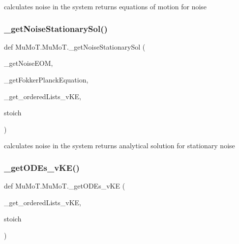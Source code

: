 calculates noise in the system returns equations of motion for noise 

\mbox{\label{namespace_mu_mo_t_1_1_mu_mo_t_a7bc4299a5e34403a5053afd4b043a0c3}} 
\subsubsection{\texorpdfstring{\+\_\+get\+Noise\+Stationary\+Sol()}{\_getNoiseStationarySol()}}
{\footnotesize\ttfamily def Mu\+Mo\+T.\+Mu\+Mo\+T.\+\_\+get\+Noise\+Stationary\+Sol (\begin{DoxyParamCaption}\item[{}]{\+\_\+get\+Noise\+E\+OM,  }\item[{}]{\+\_\+get\+Fokker\+Planck\+Equation,  }\item[{}]{\+\_\+get\+\_\+ordered\+Lists\+\_\+v\+KE,  }\item[{}]{stoich }\end{DoxyParamCaption})\hspace{0.3cm}{\ttfamily [private]}}



calculates noise in the system returns analytical solution for stationary noise 

\mbox{\label{namespace_mu_mo_t_1_1_mu_mo_t_a3154d6b17ff15c26a8da56b5fe48a1f1}} 
\subsubsection{\texorpdfstring{\+\_\+get\+O\+D\+Es\+\_\+v\+K\+E()}{\_getODEs\_vKE()}}
{\footnotesize\ttfamily def Mu\+Mo\+T.\+Mu\+Mo\+T.\+\_\+get\+O\+D\+Es\+\_\+v\+KE (\begin{DoxyParamCaption}\item[{}]{\+\_\+get\+\_\+ordered\+Lists\+\_\+v\+KE,  }\item[{}]{stoich }\end{DoxyParamCaption})\hspace{0.3cm}{\ttfamily [private]}}




